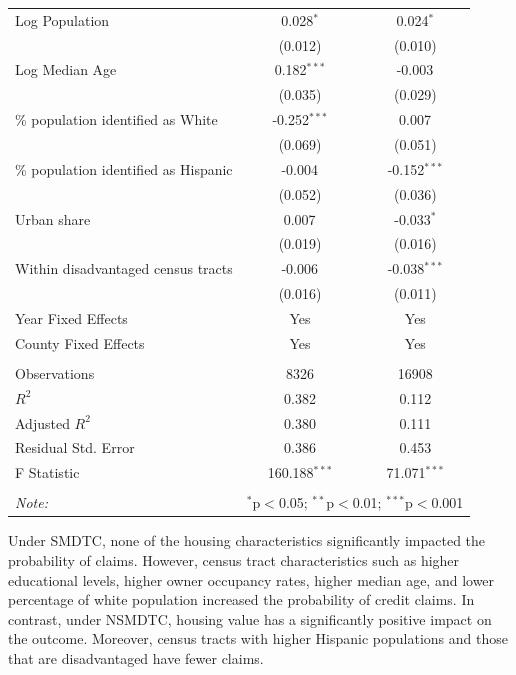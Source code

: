 \documentclass[11pt,twoside,letterpaper]{article}
\begin{document}
\begin{table}[!ht]
{\begin{tabular}{@{\extracolsep{5pt}}lcc}
 Log Population & 0.028$^{*}$ & 0.024$^{*}$ \\
& (0.012) & (0.010) \\
 Log Median Age & 0.182$^{***}$ & -0.003$^{}$ \\
& (0.035) & (0.029) \\
 \% population identified as White & -0.252$^{***}$ & 0.007$^{}$ \\
& (0.069) & (0.051) \\
 \% population identified as Hispanic & -0.004$^{}$ & -0.152$^{***}$ \\
& (0.052) & (0.036) \\
 Urban share & 0.007$^{}$ & -0.033$^{*}$ \\
& (0.019) & (0.016) \\
 Within disadvantaged census tracts & -0.006$^{}$ & -0.038$^{***}$ \\
& (0.016) & (0.011) \\
 Year Fixed Effects & Yes & Yes \\
 County Fixed Effects & Yes & Yes \\
\hline \\[-1.8ex]
 Observations & 8326 & 16908 \\
 $R^2$ & 0.382 & 0.112 \\
 Adjusted $R^2$ & 0.380 & 0.111 \\
 Residual Std. Error & 0.386 & 0.453 \\
 F Statistic & 160.188$^{***}$ & 71.071$^{***}$ \\
\hline
\hline \\[-1.8ex]
\textit{Note:} & \multicolumn{2}{r}{$^{*}$p$<$0.05; $^{**}$p$<$0.01; $^{***}$p$<$0.001} \\
\end{tabular}}
\end{table}

Under SMDTC, none of the housing characteristics significantly impacted the probability of claims. However, census tract characteristics such as higher educational levels, higher owner occupancy rates, higher median age, and lower percentage of white population increased the probability of credit claims. In contrast, under NSMDTC, housing value has a significantly positive impact on the outcome. Moreover, census tracts with higher Hispanic populations and those that are disadvantaged have fewer claims.
\end{document}
